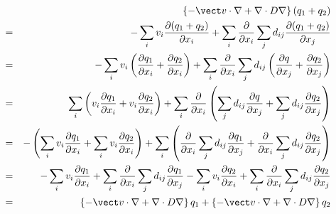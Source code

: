 \begin{eqnarray}
	& & \left \lbrace -\vect v \cdot \nabla + \nabla \cdot D \nabla \right \rbrace (q_1 + q_2) \\
	& = & - \sum_i v_i \frac{\partial (q_1+q_2)}{\partial x_i} + \sum_i \frac{\partial}{\partial x_i} \sum_j d_{ij} \frac{\partial (q_1+q_2)}{\partial x_j} \\
	& = & - \sum_i v_i \left ( \frac{\partial q_1}{\partial x_i} + \frac{\partial q_2}{\partial x_i} \right ) + \sum_i \frac{\partial}{\partial x_i} \sum_j d_{ij} \left ( \frac{\partial q}{\partial x_j} + \frac{\partial q_2}{\partial x_j} \right ) \\
	& = & \sum_i \left ( v_i \frac{\partial q_1}{\partial x_i} + v_i \frac{\partial q_2}{\partial x_i} \right ) + \sum_i \frac{\partial}{\partial x_i} \left ( \sum_j d_{ij} \frac{\partial q}{\partial x_j} + \sum_j d_{ij} \frac{\partial q_2}{\partial x_j} \right ) \\
	& = & - \left (\sum_i v_i \frac{\partial q_1}{\partial x_i} + \sum_i v_i \frac{\partial q_2}{\partial x_i} \right ) + \sum_i \left ( \frac{\partial}{\partial x_i} \sum_j d_{ij} \frac{\partial q_1}{\partial x_j} + \frac{\partial}{\partial x_i} \sum_j d_{ij} \frac{\partial q_2}{\partial x_j} \right ) \\
	& = & - \sum_i v_i \frac{\partial q_1}{\partial x_i} + \sum_i \frac{\partial}{\partial x_i} \sum_j d_{ij} \frac{\partial q_1}{\partial x_j} - \sum_i v_i \frac{\partial q_2}{\partial x_i} + \sum_i \frac{\partial}{\partial x_i} \sum_j d_{ij} \frac{\partial q_2}{\partial x_j} \\
	& = & \left \lbrace -\vect v \cdot \nabla + \nabla \cdot D \nabla \right \rbrace q_1 + \left \lbrace -\vect v \cdot \nabla + \nabla \cdot D \nabla \right \rbrace q_2
\end{eqnarray}


